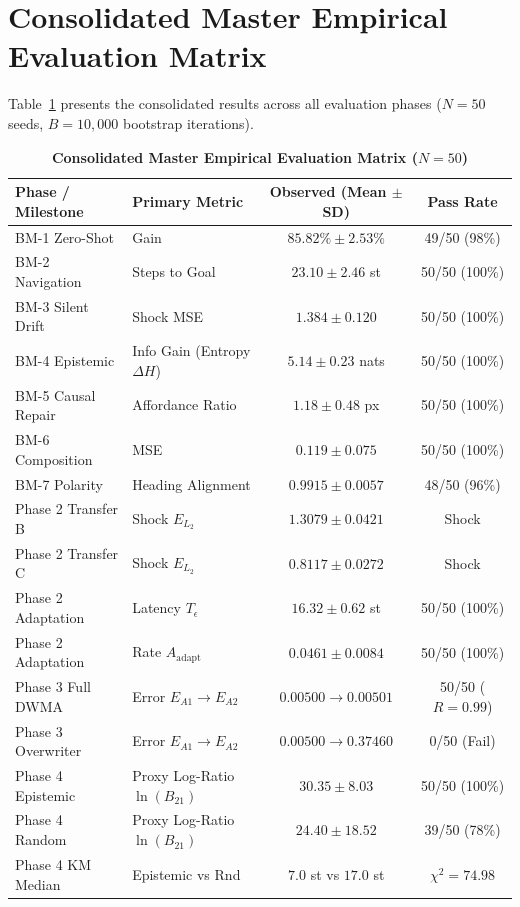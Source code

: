\documentclass[10pt,twocolumn,a4paper]{article}
\begin{document}
\section{Consolidated Master Empirical Evaluation Matrix}
Table~\ref{tab:master} presents the consolidated results across all evaluation phases ($N=50$ seeds, $B=10,000$ bootstrap iterations).

\begin{table}[h]
\centering
\scriptsize
\caption{\textbf{Consolidated Master Empirical Evaluation Matrix ($N=50$)}}
\label{tab:master}
\begin{tabular}{llcc}
\toprule
\textbf{Phase / Milestone} & \textbf{Primary Metric} & \textbf{Observed (Mean $\pm$ SD)} & \textbf{Pass Rate} \\
\midrule
BM-1 Zero-Shot & Gain & $85.82\% \pm 2.53\%$ & 49/50 (98\%) \\
BM-2 Navigation & Steps to Goal & $23.10 \pm 2.46$ st & 50/50 (100\%) \\
BM-3 Silent Drift & Shock MSE & $1.384 \pm 0.120$ & 50/50 (100\%) \\
BM-4 Epistemic & Info Gain (Entropy $\Delta H$) & $5.14 \pm 0.23$ nats & 50/50 (100\%) \\
BM-5 Causal Repair & Affordance Ratio & $1.18 \pm 0.48$ px & 50/50 (100\%) \\
BM-6 Composition & MSE & $0.119 \pm 0.075$ & 50/50 (100\%) \\
BM-7 Polarity & Heading Alignment & $0.9915 \pm 0.0057$ & 48/50 (96\%) \\
\midrule
Phase 2 Transfer B & Shock $E_{L_2}$ & $1.3079 \pm 0.0421$ & Shock \\
Phase 2 Transfer C & Shock $E_{L_2}$ & $0.8117 \pm 0.0272$ & Shock \\
Phase 2 Adaptation & Latency $T_\epsilon$ & $16.32 \pm 0.62$ st & 50/50 (100\%) \\
Phase 2 Adaptation & Rate $A_{\text{adapt}}$ & $0.0461 \pm 0.0084$ & 50/50 (100\%) \\
\midrule
Phase 3 Full DWMA & Error $E_{A1} \to E_{A2}$ & $0.00500 \to 0.00501$ & 50/50 ($R=0.99$) \\
Phase 3 Overwriter & Error $E_{A1} \to E_{A2}$ & $0.00500 \to 0.37460$ & 0/50 (Fail) \\
\midrule
Phase 4 Epistemic & Proxy Log-Ratio $\ln(B_{21})$ & $30.35 \pm 8.03$ & 50/50 (100\%) \\
Phase 4 Random & Proxy Log-Ratio $\ln(B_{21})$ & $24.40 \pm 18.52$ & 39/50 (78\%) \\
Phase 4 KM Median & Epistemic vs Rnd & $7.0$ st vs $17.0$ st & $\chi^2 = 74.98$ \\
\bottomrule
\end{tabular}
\end{table}
\end{document}
